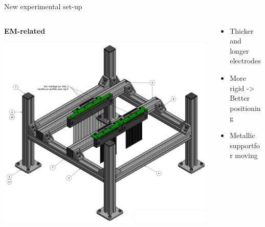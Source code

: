 \documentclass[utf8]{beamer} \usetheme{lfcr} %
\begin{document}
\begin{frame}{New experimental set-up}
  \begin{columns}
    \begin{column}{0.5\textwidth}
      \textbf{EM-related}

      \includegraphics[width=\textwidth]{electrodes.pdf}
    \end{column}
    \begin{column}{0.5\textwidth}
      \begin{itemize}
        \item Thicker and longer electrodes
        \item More rigid -> Better positioning
        \item Metallic supportfor moving
      \end{itemize}

    \end{column}
  \end{columns}
\end{frame}
%
\end{document}
